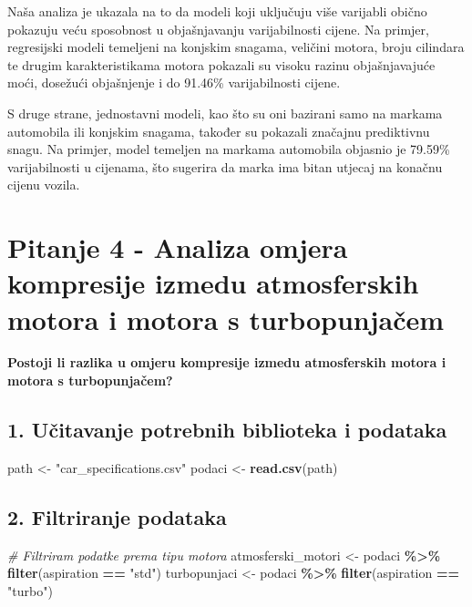 \documentclass[
]{article}
\newenvironment{Shaded}{\begin{snugshade}}{\end{snugshade}}
\newcommand{\CommentTok}[1]{\textcolor[rgb]{0.56,0.35,0.01}{\textit{#1}}}
\newcommand{\FunctionTok}[1]{\textcolor[rgb]{0.13,0.29,0.53}{\textbf{#1}}}
\newcommand{\NormalTok}[1]{#1}
\newcommand{\OtherTok}[1]{\textcolor[rgb]{0.56,0.35,0.01}{#1}}
\newcommand{\SpecialCharTok}[1]{\textcolor[rgb]{0.81,0.36,0.00}{\textbf{#1}}}
\newcommand{\StringTok}[1]{\textcolor[rgb]{0.31,0.60,0.02}{#1}}
\begin{document}
Naša analiza je ukazala na to da modeli koji uključuju više varijabli
obično pokazuju veću sposobnost u objašnjavanju varijabilnosti cijene.
Na primjer, regresijski modeli temeljeni na konjskim snagama, veličini
motora, broju cilindara te drugim karakteristikama motora pokazali su
visoku razinu objašnjavajuće moći, dosežući objašnjenje i do 91.46\%
varijabilnosti cijene.

S druge strane, jednostavni modeli, kao što su oni bazirani samo na
markama automobila ili konjskim snagama, također su pokazali značajnu
prediktivnu snagu. Na primjer, model temeljen na markama automobila
objasnio je 79.59\% varijabilnosti u cijenama, što sugerira da marka ima
bitan utjecaj na konačnu cijenu vozila.

\section{Pitanje 4 - Analiza omjera kompresije izmedu atmosferskih
motora i motora s
turbopunjačem}\label{pitanje-4---analiza-omjera-kompresije-izmedu-atmosferskih-motora-i-motora-s-turbopunjaux10dem}

\textbf{Postoji li razlika u omjeru kompresije izmedu atmosferskih
motora i motora s turbopunjačem?}

\subsection{1. Učitavanje potrebnih biblioteka i
podataka}\label{uux10ditavanje-potrebnih-biblioteka-i-podataka}

\begin{Shaded}
\begin{Highlighting}[]
\NormalTok{path }\OtherTok{\textless{}{-}} \StringTok{"car\_specifications.csv"}
\NormalTok{podaci }\OtherTok{\textless{}{-}} \FunctionTok{read.csv}\NormalTok{(path)}
\end{Highlighting}
\end{Shaded}

\subsection{2. Filtriranje podataka}\label{filtriranje-podataka}

\begin{Shaded}
\begin{Highlighting}[]
\CommentTok{\# Filtriram podatke prema tipu motora}
\NormalTok{atmosferski\_motori }\OtherTok{\textless{}{-}}\NormalTok{ podaci }\SpecialCharTok{\%\textgreater{}\%} \FunctionTok{filter}\NormalTok{(aspiration }\SpecialCharTok{==} \StringTok{"std"}\NormalTok{)}
\NormalTok{turbopunjaci }\OtherTok{\textless{}{-}}\NormalTok{ podaci }\SpecialCharTok{\%\textgreater{}\%} \FunctionTok{filter}\NormalTok{(aspiration }\SpecialCharTok{==} \StringTok{"turbo"}\NormalTok{)}
\end{Highlighting}
\end{Shaded}
\end{document}
